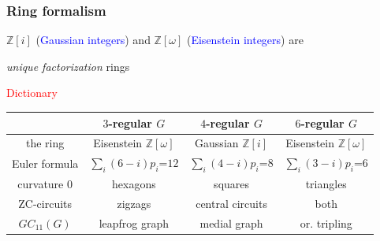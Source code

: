 \documentclass{beamer}
\newcommand{\ZZ}{\ensuremath{\mathbb{Z}}}
\begin{document}
\begin{frame}\frametitle{Ring formalism}
$\ZZ[i]$ (\textcolor{blue}{Gaussian integers}) and
$\ZZ[\omega]$ (\textcolor{blue}{Eisenstein integers})
are 

{\em unique factorization} rings
\begin{center}
\textcolor{red}{Dictionary}
\end{center}
\begin{center}
{\small
\begin{tabular}{||c|c|c|c||}
\hline\hline
   &$3$-regular $G$& $4$-regular
$G$ &$6$-regular $G$\\\hline
the ring           &Eisenstein
$\ZZ[\omega]$ &Gaussian
$\ZZ[i]$&Eisenstein
$\ZZ[\omega]$\\
Euler formula  &$\sum_{i} (6-i)p_i$=$12$
&$\sum_{i}
(4-i)p_i$=$8$&$\sum_{i} (3-i)p_i$=$6$\\
curvature $0$&hexagons
&squares&triangles\\
ZC-circuits    &zigzags
&central circuits& both\\
$GC_{11}(G)$      &leapfrog graph
    &medial graph& or. tripling\\
\hline\hline\end{tabular}
}
\end{center}
\end{frame} 




\end{document}
